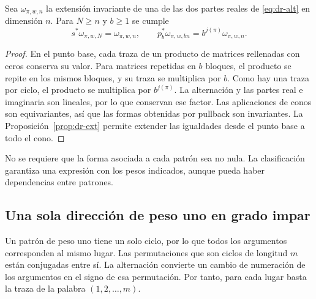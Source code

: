 \begin{proposicion}
\label{prop:dr-peso}
Sea $\omega_{\pi,w,n}$ la extensión invariante de una de las dos partes reales de \eqref{eq:dr-alt} en dimensión $n$. Para $N\ge n$ y $b\ge1$ se cumple
\begin{equation}
 s^*\omega_{\pi,w,N}=\omega_{\pi,w,n},\qquad
 p_b^*\omega_{\pi,w,bn}=b^{j(\pi)}\omega_{\pi,w,n}.
 \label{eq:dr-peso}
\end{equation}
\end{proposicion}
\begin{proof}
En el punto base, cada traza de un producto de matrices rellenadas con ceros conserva su valor. Para matrices repetidas en $b$ bloques, el producto se repite en los mismos bloques, y su traza se multiplica por $b$. Como hay una traza por ciclo, el producto se multiplica por $b^{j(\pi)}$. La alternación y las partes real e imaginaria son lineales, por lo que conservan ese factor. Las aplicaciones de conos son equivariantes, así que las formas obtenidas por pullback son invariantes. La Proposición~\ref{prop:dr-ext} permite extender las igualdades desde el punto base a todo el cono.
\end{proof}

No se requiere que la forma asociada a cada patrón sea no nula. La clasificación garantiza una expresión con los pesos indicados, aunque pueda haber dependencias entre patrones.

\subsection{Una sola dirección de peso uno en grado impar}

Un patrón de peso uno tiene un solo ciclo, por lo que todos los argumentos corresponden al mismo lugar. Las permutaciones que son ciclos de longitud $m$ están conjugadas entre sí. La alternación convierte un cambio de numeración de los argumentos en el signo de esa permutación. Por tanto, para cada lugar basta la traza de la palabra $(1,2,\ldots,m)$.

